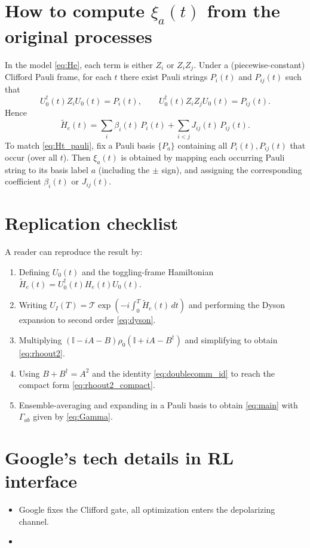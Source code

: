 \documentclass[11pt]{article}
\newcommand{\id}{\mathbb{I}}
\begin{document}
\section{How to compute $\xi_a(t)$ from the original processes}
In the model \eqref{eq:He}, each term is either $Z_i$ or $Z_iZ_j$. Under a (piecewise-constant) Clifford Pauli frame, for each $t$ there exist Pauli strings $P_i(t)$ and $P_{ij}(t)$ such that
\begin{equation}
U_0^\dagger(t) Z_i U_0(t)=P_i(t),\qquad
U_0^\dagger(t) Z_iZ_j U_0(t)=P_{ij}(t).
\end{equation}
Hence
\begin{equation}
\widetilde H_e(t)=\sum_i \beta_i(t)\,P_i(t)+\sum_{i<j}J_{ij}(t)\,P_{ij}(t).
\end{equation}
To match \eqref{eq:Ht_pauli}, fix a Pauli basis $\{P_a\}$ containing all $P_i(t),P_{ij}(t)$ that occur (over all $t$). Then $\xi_a(t)$ is obtained by mapping each occurring Pauli string to its basis label $a$ (including the $\pm$ sign), and assigning the corresponding coefficient $\beta_i(t)$ or $J_{ij}(t)$.

\section{Replication checklist}
A reader can reproduce the result by:
\begin{enumerate}
\item Defining $U_0(t)$ and the toggling-frame Hamiltonian $\widetilde H_e(t)=U_0^\dagger(t)H_e(t)U_0(t)$.
\item Writing $U_I(T)=\mathcal{T}\exp(-i\int_0^T \widetilde H_e(t)\,dt)$ and performing the Dyson expansion to second order \eqref{eq:dyson}.
\item Multiplying $(\id-iA-B)\rho_0(\id+iA-B^\dagger)$ and simplifying to obtain \eqref{eq:rhoout2}.
\item Using $B+B^\dagger=A^2$ and the identity \eqref{eq:doublecomm_id} to reach the compact form \eqref{eq:rhoout2_compact}.
\item Ensemble-averaging and expanding in a Pauli basis to obtain \eqref{eq:main} with $\Gamma_{ab}$ given by \eqref{eq:Gamma}.
\end{enumerate}

\section{Google's tech details in RL interface}

\begin{itemize}
	\item Google fixes the Clifford gate, all optimization enters the depolarizing channel. 
	\item 
\end{itemize}
\end{document}
